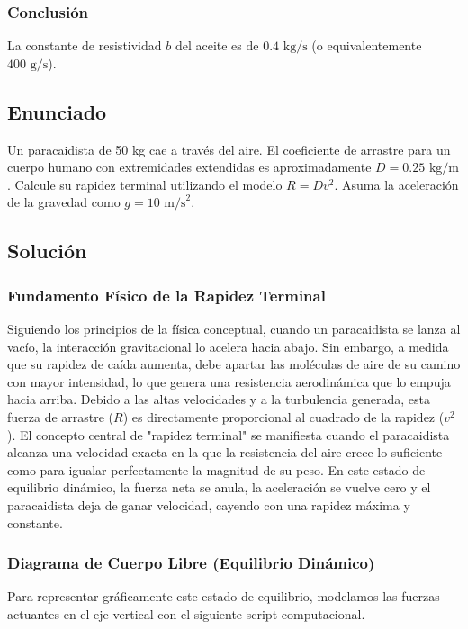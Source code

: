 \documentclass[12pt]{article}
\begin{document}
\subsubsection*{Conclusión}
La constante de resistividad $b$ del aceite es de $0.4 \text{ kg/s}$ (o equivalentemente $400 \text{ g/s}$).

\newpage

\subsection*{Enunciado}
Un paracaidista de 50 kg cae a través del aire. El coeficiente de arrastre para un cuerpo humano con extremidades extendidas es aproximadamente $D = 0.25 \text{ kg/m}$. Calcule su rapidez terminal utilizando el modelo $R = Dv^2$. Asuma la aceleración de la gravedad como $g = 10 \text{ m/s}^2$.

\subsection*{Solución}

\subsubsection*{Fundamento Físico de la Rapidez Terminal}
Siguiendo los principios de la física conceptual, cuando un paracaidista se lanza al vacío, la interacción gravitacional lo acelera hacia abajo. Sin embargo, a medida que su rapidez de caída aumenta, debe apartar las moléculas de aire de su camino con mayor intensidad, lo que genera una resistencia aerodinámica que lo empuja hacia arriba. Debido a las altas velocidades y a la turbulencia generada, esta fuerza de arrastre ($R$) es directamente proporcional al cuadrado de la rapidez ($v^2$). 
El concepto central de "rapidez terminal" se manifiesta cuando el paracaidista alcanza una velocidad exacta en la que la resistencia del aire crece lo suficiente como para igualar perfectamente la magnitud de su peso. En este estado de equilibrio dinámico, la fuerza neta se anula, la aceleración se vuelve cero y el paracaidista deja de ganar velocidad, cayendo con una rapidez máxima y constante.

\subsubsection*{Diagrama de Cuerpo Libre (Equilibrio Dinámico)}
Para representar gráficamente este estado de equilibrio, modelamos las fuerzas actuantes en el eje vertical con el siguiente script computacional.
\end{document}

